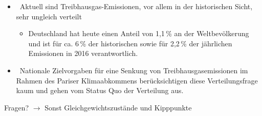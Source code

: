 \begin{frame}
{\begin{itemize}
\begin{itemize}
          \item[\rightarrow] Werden historische Emissionen der Länder berücksichtigt?
        \end{itemize}
        \item[] Aktuell sind Treibhausgas-Emissionen, vor allem in der historischen Sicht, sehr ungleich verteilt
        \begin{itemize}
          \item[\rightarrow] Deutschland hat heute einen Anteil von 1,1\,\% an der Weltbevölkerung und ist für ca. 6\,\% der historischen sowie für 2,2\,\% der jährlichen Emissionen in 2016 verantwortlich.
        \end{itemize}
        \item[] Nationale Zielvorgaben für eine Senkung von Treibhausgasemissionen im Rahmen des Pariser Klimaabkommens berücksichtigen diese Verteilungsfrage kaum und gehen vom Status Quo der Verteilung aus.
      \end{itemize}
      Fragen? $\rightarrow$ Sonst Gleichgewichtszustände und Kipppunkte
    }
\end{frame}
